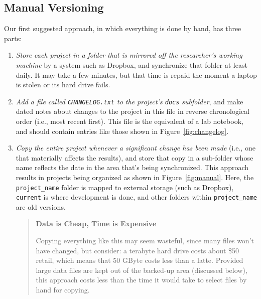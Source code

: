 \documentclass[10pt]{article}
\newcommand{\recommend}[1]{\textit{#1}}
\begin{document}
\subsection*{Manual Versioning}

Our first suggested approach, in which everything is done by hand, has
three parts:

\begin{enumerate}

\item
  \recommend{Store each project in a folder that is mirrored off the
    researcher's working machine} by a system such as Dropbox, and
  synchronize that folder at least daily. It may take a few minutes,
  but that time is repaid the
  moment a laptop is stolen or its hard drive fails.

\item
  \recommend{Add a file called \texttt{CHANGELOG.txt} to the project's
    \texttt{docs} subfolder}, and make dated notes about changes to
  the project in this file in reverse chronological order (i.e., most
  recent first). This file is the equivalent of a lab notebook, and
  should contain entries like those shown in
  Figure~\ref{fig:changelog}.

\item
  \recommend{Copy the entire project whenever a significant change has
    been made} (i.e., one that materially affects the results), and store that
    copy in a sub-folder whose name reflects
  the date in the area that's being synchronized. This approach
  results in projects being organized as shown in
  Figure~\ref{fig:manual}.  Here, the \texttt{project\_name} folder is
  mapped to external storage (such as Dropbox), \texttt{current} is
  where development is done, and other folders within
  \texttt{project\_name} are old versions.

  \begin{quote}
    \noindent \textbf{Data is Cheap, Time is Expensive}

    Copying everything like this may seem wasteful, since many files
    won't have changed, but consider: a terabyte hard drive costs
    about \$50 retail, which means that 50 GByte costs less than a
    latte. Provided large data files are kept out of the backed-up
    area (discussed below), this approach costs less than the time it
    would take to select files by hand for copying.
  \end{quote}

\end{enumerate}
\end{document}
